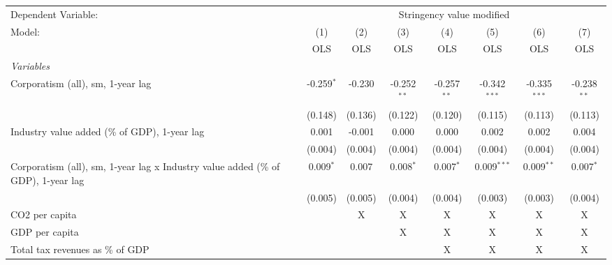 
\begingroup
\centering
\begin{tabular}{lccccccc}
   \toprule
   Dependent Variable: & \multicolumn{7}{c}{Stringency value modified}\\
   Model:                                                                            & (1)          & (2)     & (3)           & (4)           & (5)            & (6)            & (7)\\  
                                                                                     &  OLS         & OLS     & OLS           & OLS           & OLS            & OLS            & OLS\\  
   \midrule
   \emph{Variables}\\
   Corporatism (all), sm, 1-year lag                                                 & -0.259$^{*}$ & -0.230  & -0.252$^{**}$ & -0.257$^{**}$ & -0.342$^{***}$ & -0.335$^{***}$ & -0.238$^{**}$\\   
                                                                                     & (0.148)      & (0.136) & (0.122)       & (0.120)       & (0.115)        & (0.113)        & (0.113)\\   
   Industry value added (\% of GDP), 1-year lag                                      & 0.001        & -0.001  & 0.000         & 0.000         & 0.002          & 0.002          & 0.004\\   
                                                                                     & (0.004)      & (0.004) & (0.004)       & (0.004)       & (0.004)        & (0.004)        & (0.004)\\   
   Corporatism (all), sm, 1-year lag x Industry value added (\% of GDP), 1-year lag  & 0.009$^{*}$  & 0.007   & 0.008$^{*}$   & 0.007$^{*}$   & 0.009$^{***}$  & 0.009$^{**}$   & 0.007$^{*}$\\   
                                                                                     & (0.005)      & (0.005) & (0.004)       & (0.004)       & (0.003)        & (0.003)        & (0.004)\\   
   CO2 per capita                                                                    &              & X       & X             & X             & X              & X              & X\\  
   GDP per capita                                                                    &              &         & X             & X             & X              & X              & X\\  
   Total tax revenues as \% of GDP                                                   &              &         &               & X             & X              & X              & X\\  

\end{tabular}
